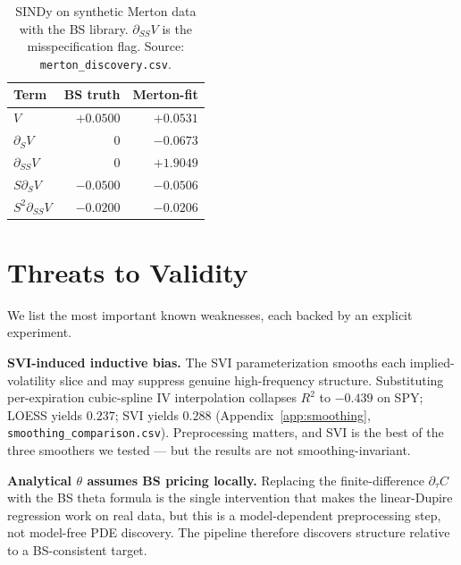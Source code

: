 \documentclass[10pt]{article}
\begin{document}
\begin{table}[h]
\centering\footnotesize
\caption{SINDy on synthetic Merton data with the BS library. $\partial_{SS}V$ is the misspecification flag. Source: \texttt{merton\_discovery.csv}.}
\label{tab:merton}
\begin{tabular}{lrr}
\toprule
Term & BS truth & Merton-fit \\
\midrule
$V$              & $+0.0500$ & $+0.0531$ \\
$\partial_S V$   & $0$       & $-0.0673$ \\
$\partial_{SS}V$ & $0$       & $\mathbf{+1.9049}$ \\
$S\partial_S V$  & $-0.0500$ & $-0.0506$ \\
$S^2\partial_{SS}V$ & $-0.0200$ & $-0.0206$ \\
\bottomrule
\end{tabular}
\end{table}

\section{Threats to Validity}\label{sec:threats}

We list the most important known weaknesses, each backed by an explicit experiment.

\textbf{SVI-induced inductive bias.} The SVI parameterization smooths each implied-volatility slice and may suppress genuine high-frequency structure. Substituting per-expiration cubic-spline IV interpolation collapses $R^2$ to $-0.439$ on SPY; LOESS yields $0.237$; SVI yields $0.288$ (Appendix~\ref{app:smoothing}, \texttt{smoothing\_comparison.csv}). Preprocessing matters, and SVI is the best of the three smoothers we tested --- but the results are not smoothing-invariant.

\textbf{Analytical $\theta$ assumes BS pricing locally.} Replacing the finite-difference $\partial_\tau C$ with the BS theta formula is the single intervention that makes the linear-Dupire regression work on real data, but this is a model-dependent preprocessing step, not model-free PDE discovery. The pipeline therefore discovers structure relative to a BS-consistent target.
\end{document}

